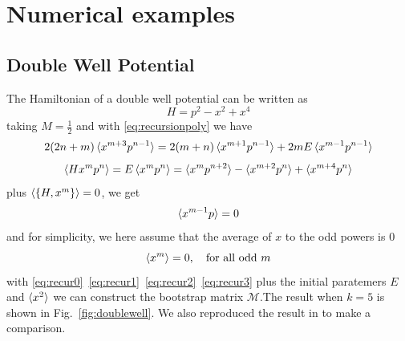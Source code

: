 \documentclass[aps, preprint,amsmath, amssymb]{revtex4-2}
\begin{document}
\section{Numerical examples}
\subsection {Double Well Potential}
The Hamiltonian of a double well potential can be written as
\begin{equation}
    H = p^2 - x^2 + x^4
\end{equation}
taking $M = \frac12$ and with \eqref{eq:recursionpoly} we have
\begin{equation}
    2(2n + m)\braket{x^{m + 3} p^{n - 1}} = 2(m + n)\braket{x^{m + 1} p^{n - 1}} + 2mE\braket{x^{m - 1} p^{n - 1}} \label{eq:recur0}
\end{equation}
\begin{equation}
    \braket{Hx^m p^n} = E\braket{x^m p^n} = \braket{x^m p^{n + 2}} - \braket{x^{m + 2} p^n} + \braket{x^{m + 4} p^n} \label{eq:recur1}
\end{equation}
plus $\braket{\{H, x^m\}} = 0$, we get
\begin{equation}
    \braket{x^{m - 1} p} = 0 \label{eq:recur2}
\end{equation}
and for simplicity, we here assume that the average of $x$ to the odd powers is $0$
\begin{equation}
    \braket{x^m} = 0,\ \ \ \text{for all odd}\ m \label{eq:recur3}
\end{equation}
with \eqref{eq:recur0}~\eqref{eq:recur1}~\eqref{eq:recur2}~\eqref{eq:recur3} plus the initial paratemers $E$ and $\braket{x^2}$ we can construct the bootstrap matrix $\bm{\mathcal{M}}$.The result when $k = 5$ is shown in Fig.~\ref{fig:doublewell}. We also reproduced the result in \cite{Nakayama_2022} to make a comparison.
\end{document}
